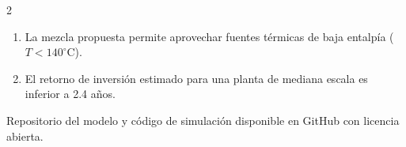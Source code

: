 \documentclass[11pt]{article}
\begin{document}
\begin{multicols}{2}
  \vspace{0.4cm}

  \begin{tcolorbox}[title=4. Conclusiones y Aplicabilidad]
    \begin{enumerate}
      \item La mezcla propuesta permite aprovechar fuentes térmicas de baja entalpía ($T < 140^\circ\text{C}$).
      \item El retorno de inversión estimado para una planta de mediana escala es inferior a 2.4 años.
    \end{enumerate}
    \vspace{0.2cm}
    \color{gray} \footnotesize Repositorio del modelo y código de simulación disponible en GitHub con licencia abierta.
  \end{tcolorbox}

\end{multicols}
\end{document}
